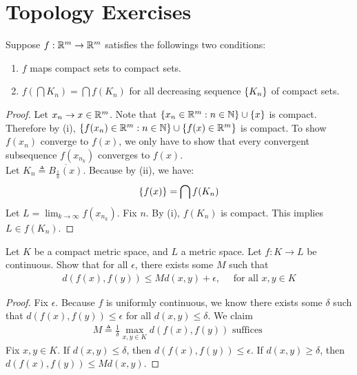 \documentclass{report}
\begin{document}
\section{Topology Exercises}
\begin{question}{}{}
Suppose $f:\mathbb{R}^m \rightarrow \mathbb{R}^m$ satisfies the followings two conditions: 
\begin{enumerate}[label=(\roman*)]
  \item $f$ maps compact sets to compact sets. 
  \item $f\left(\bigcap K_n\right)=\bigcap f(K_n)$ for all decreasing sequence  $\left\{ K_n \right\}$ of compact sets. 
\end{enumerate}
\end{question}
\begin{proof}
  Let $x_n \rightarrow x \in \mathbb{R}^m$. Note that $\left\{ x_n\in\mathbb{R}^m: n\in\mathbb{N} \right\}\cup  \left\{ x \right\}$ is compact. Therefore by (i), $\left\{ f(x_n)\in\mathbb{R}^m:n \in\mathbb{N} \right\}\cup  \left\{ f(x)\in\mathbb{R}^m \right\}$ is compact. To show $f(x_n)$ converge to $f(x)$, we only have to show that every convergent subsequence $f(x_{n_k})$ converges to $f(x)$. \\

Let $K_n \triangleq \overline{B_{\frac{1}{n}}(x)}$. Because by (ii), we have: 
\begin{align*}
\left\{ f(x) \right\}= \bigcap f(K_n)
\end{align*}
Let $L=\lim_{k\to \infty}f(x_{n_k})$. Fix $n$. By  (i), $f(K_n)$ is compact. This implies $L \in f(K_n)$.  
\end{proof}
\begin{question}{}{}
Let $K$ be a compact metric space, and  $L$ a metric space. Let  $f:K \rightarrow L$ be continuous. Show that for all $\epsilon $, there exists some $M$ such that 
 \begin{align*}
d\left(f(x),f(y) \right)\leq M d(x,y) + \epsilon ,\quad \text{ for all }x,y \in K
\end{align*}
\end{question}
\begin{proof}
Fix $\epsilon $. Because $f$ is uniformly continuous, we know there exists some $\delta$ such that $d(f(x),f(y))\leq \epsilon $ for all $d(x,y)\leq \delta$. We claim 
\begin{align*}
M\triangleq \frac{1}{\delta} \max _{x,y \in K} d\left(f(x),f(y) \right)\text{ suffices }
\end{align*}
Fix $x,y \in K$. If  $d(x,y)\leq \delta $, then $d\left(f(x),f(y) \right) \leq \epsilon $. If $d(x,y)\geq \delta$, then $d\left(f(x),f(y) \right) \leq M d(x,y)$. 
\end{proof}
\end{document}
